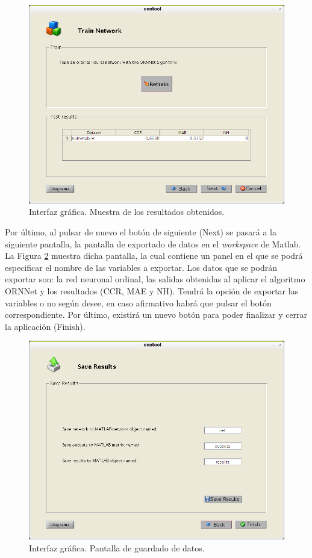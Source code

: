 		\begin{figure}[htbp]
			\centering
			\includegraphics[scale=0.5]{interfaz/interface14.png}
			\caption{Interfaz gráfica. Muestra de los resultados obtenidos.}
			\label{fig:int14}
		\end{figure}
		
		Por último, al pulsar de nuevo el botón de siguiente (Next) se pasará a la siguiente pantalla, la pantalla de exportado de datos en el \textit{workspace} de Matlab. La Figura \ref{fig:int15} muestra dicha pantalla, la cual contiene un panel en el que se podrá especificar el nombre de las variables a exportar. Los datos que se podrán exportar son: la red neuronal ordinal, las salidas obtenidas al aplicar el algoritmo ORNNet y los resultados (CCR, MAE y NH). Tendrá la opción de exportar las variables o no según desee, en caso afirmativo habrá que pulsar el botón correspondiente. Por último, existirá un nuevo botón para poder finalizar y cerrar la aplicación (Finish).\\
		
		\begin{figure}[htbp]
			\centering
			\includegraphics[scale=0.5]{interfaz/interface15.png}
			\caption{Interfaz gráfica. Pantalla de guardado de datos.}
			\label{fig:int15}
		\end{figure}
		
